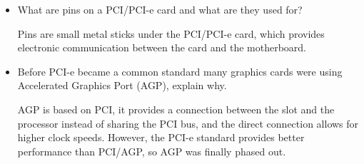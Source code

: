 \documentclass{article}
\begin{document}
\begin{itemize}
\item What are pins on a PCI/PCI-e card and what are they used for?

Pins are small metal sticks under the PCI/PCI-e card, which provides electronic communication between the card and the motherboard.

\item Before PCI-e became a common standard many graphics cards were using Accelerated Graphics Port (AGP), explain why.

AGP is based on PCI, it provides a connection between the slot and the processor instead of sharing the PCI bus, and the direct connection allows for higher clock speeds. However, the PCI-e standard provides better performance than PCI/AGP, so AGP was finally phased out.


\end{itemize}
\end{document}
